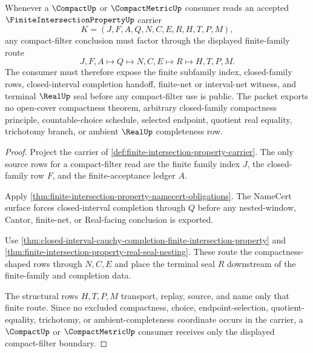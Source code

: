 \begin{theorem}
\label{thm:finite-intersection-property-compact-filter-route}
Whenever a $\CompactUp$ or $\CompactMetricUp$ consumer reads an accepted $\FiniteIntersectionPropertyUp$ carrier
$$
K=(J,F,A,Q,N,C,E,R,H,T,P,M),
$$
any compact-filter conclusion must factor through the displayed finite-family route
$$
J,F,A \longmapsto Q \longmapsto N,C,E \longmapsto R \longmapsto H,T,P,M.
$$
The consumer must therefore expose the finite subfamily index, closed-family rows, closed-interval completion handoff, finite-net or interval-net witness, and terminal $\RealUp$ seal before any compact-filter use is public. The packet exports no open-cover compactness theorem, arbitrary closed-family compactness principle, countable-choice schedule, selected endpoint, quotient real equality, trichotomy branch, or ambient $\RealUp$ completeness row.
\end{theorem}
\begin{proof}
Project the carrier of \autoref{def:finite-intersection-property-carrier}. The only source rows for a compact-filter read are the finite family index $J$, the closed-family row $F$, and the finite-acceptance ledger $A$.

Apply \autoref{thm:finite-intersection-property-namecert-obligations}. The NameCert surface forces closed-interval completion through $Q$ before any nested-window, Cantor, finite-net, or Real-facing conclusion is exported.

Use \autoref{thm:closed-interval-cauchy-completion-finite-intersection-property} and \autoref{thm:finite-intersection-property-real-seal-nesting}. These route the compactness-shaped rows through $N,C,E$ and place the terminal seal $R$ downstream of the finite-family and completion data.

The structural rows $H,T,P,M$ transport, replay, source, and name only that finite route. Since no excluded compactness, choice, endpoint-selection, quotient-equality, trichotomy, or ambient-completeness coordinate occurs in the carrier, a $\CompactUp$ or $\CompactMetricUp$ consumer receives only the displayed compact-filter boundary.
\end{proof}

